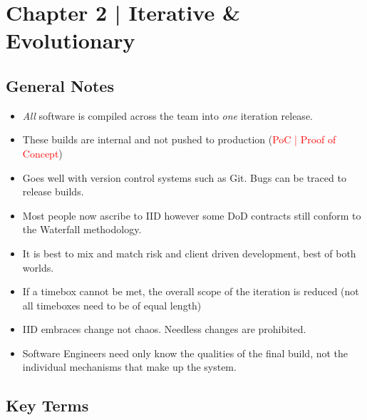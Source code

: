 \documentclass{article}
\begin{document}
\begin{itemize}
\end{itemize}
\newpage

\section{Chapter 2 | Iterative \& Evolutionary}


\subsection{General Notes}

\begin{itemize}

\item \emph{All} software is compiled across the team into \emph{one} iteration release.
\item These builds are internal and not pushed to production (\textcolor{red}{PoC | Proof of Concept})
\item Goes well with version control systems such as Git. Bugs can be traced to release builds.
\item Most people now ascribe to IID however some DoD contracts still conform to the Waterfall methodology.
\item It is best to mix and match risk and client driven development, best of both worlds.
\item If a timebox cannot be met, the overall scope of the iteration is reduced (not all timeboxes need to be of equal length)
\item IID embraces change not chaos. Needless changes are prohibited.
\item Software Engineers need only know the qualities of the final build, not the individual mechanisms that make up the system.

\end{itemize}

\subsection{Key Terms}
\end{document}
